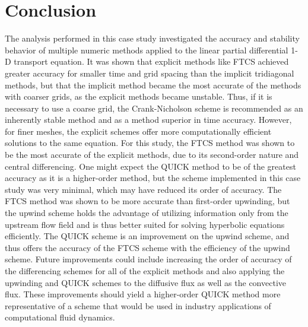 \documentclass[twocolumn,10pt]{asme2ej}
\begin{document}
\section{Conclusion}
The analysis performed in this case study investigated the accuracy and stability behavior of multiple numeric methods applied to the linear partial differential 1-D transport equation.  It was shown that explicit methods like FTCS achieved greater accuracy for smaller time and grid spacing than the implicit tridiagonal methods, but that the implicit method became the most accurate of the methods with coarser grids, as the explicit methods became unstable.  Thus, if it is necessary to use a coarse grid, the Crank-Nicholson scheme is recommended as an inherently stable method and as a method superior in time accuracy.  However, for finer meshes, the explicit schemes offer more computationally efficient solutions to the same equation.  For this study, the FTCS method was shown to be the most accurate of the explicit methods, due to its second-order nature and central differencing.  One might expect the QUICK method to be of the greatest accuracy as it is a higher-order method, but the scheme implemented in this case study was very minimal, which may have reduced its order of accuracy.  The FTCS method was shown to be more accurate than first-order upwinding, but the upwind scheme holds the advantage of utilizing information only from the upstream flow field and is thus better suited for solving hyperbolic equations efficiently.  The QUICK scheme is an improvement on the upwind scheme, and thus offers the accuracy of the FTCS scheme with the efficiency of the upwind scheme.  Future improvements could include increasing the order of accuracy of the differencing schemes for all of the explicit methods and also applying the upwinding and QUICK schemes to the diffusive flux as well as the convective flux.  These improvements should yield a higher-order QUICK method more representative of a scheme that would be used in industry applications of computational fluid dynamics.

\end{document}
